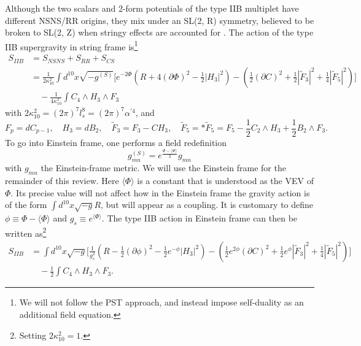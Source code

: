 Although the two scalars and 2-form potentials of the type IIB multiplet have different NSNS/RR origins, they mix under an SL(2, R) symmetry, believed to be broken to SL(2, Z) when stringy effects are accounted for \cite{Schwarz:1995dk}.
The action of the type IIB supergravity \cite{Schwarz:1983qr,Howe:1983sra} in string frame \cite{Becker:2006dvp,ValeixoBento:2025emh} is\footnote{
We will not follow the PST approach, and instead impose self-duality as an additional field equation.
}
\begin{equation}
\begin{aligned}
S_{IIB}
&=S_{NSNS} + S_{RR} + S_{CS}\\
&=\frac{1}{2\kappa_{10}^2}
\int d^{10}x \sqrt{-g^{(S)}}
\Bigg[
e^{-2\Phi}\left(R + 4(\partial\Phi)^2-\frac{1}{2}|H_3|^2\right)
-\left(\frac{1}{2}(\partial C)^2+\frac{1}{2}|\tilde F_3|^2+\frac{1}{4}|\tilde{F}_5|^2\right)
\Bigg]\\
&\quad -\frac{1}{4\kappa_{10}^2}\int C_4\wedge H_3\wedge F_3
\end{aligned}
\label{string frame IIB action}
\end{equation}
with $2\kappa_{10}^2=(2\pi)^7l_s^8=(2\pi)^7\alpha^{\prime 4}$, and
\begin{equation}
F_p = dC_{p-1}, \quad 
H_3 = dB_2, \quad
\tilde F_3 = F_3 - C H_3,\quad
\tilde F_5 = * \tilde F_5 = F_5 - \frac12 C_2\wedge H_3 + \frac12 B_2\wedge F_3.
\end{equation}
To go into Einstein frame, one performs a field redefinition
\begin{equation}
g^{(S)}_{mn} = e^{\frac{\Phi-\langle\Phi \rangle}{2}} g_{mn}
\end{equation}
with $g_{mn}$ the Einstein-frame metric. 
We will use the Einstein frame for the remainder of this review.
Here $\langle \Phi \rangle$ is a constant that is understood as the VEV of $\Phi$. Its precise value will not affect how in the Einstein frame the gravity action is of the form $\int d^{10}x\sqrt{-g} R$, but will appear as a coupling.
It is customary to define $\phi \equiv \Phi - \langle \Phi\rangle$ and $g_s \equiv e^{\langle \Phi\rangle}$.
The type IIB action in Einstein frame can then be written as\footnote{Setting $2\kappa_{10}^2=1$.}
\begin{equation}
\begin{aligned}
S_{IIB}
&=
\int d^{10}x \sqrt{-g}
\Bigg[
\frac{1}{g_s^2}\left(R - \frac{1}{2}(\partial\phi)^2-\frac{1}{2}e^{-\phi}|H_3|^2\right)
-\left(\frac{1}{2}e^{2\phi}(\partial C)^2+\frac{1}{2}e^\phi|\tilde F_3|^2+\frac{1}{4}|\tilde{F}_5|^2\right)
\Bigg]\\
&\quad -\frac{1}{2}\int C_4\wedge H_3\wedge F_3.
\end{aligned}
\label{Einstein frame IIB action}
\end{equation}

